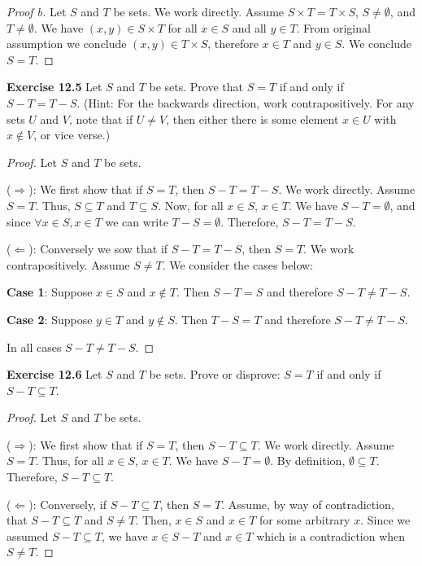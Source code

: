 \documentclass[12pt,oneside]{article}
\newenvironment{exercise}[1]{\vspace{.1in}\noindent\textbf{Exercise #1 \hspace{.05em}}}{}
\begin{document}
\begin{proof}[Proof b]
Let $S$ and $T$ be sets. We work directly. Assume $S \times T = T \times S$, $S \not= \emptyset$, and $T \not= \emptyset$. We have $(x, y) \in S \times T$ for all $x \in S$ and all $y \in T$. From original assumption we conclude $(x, y) \in T \times S$, therefore $x \in T$ and $y \in S$. We conclude $S = T$.
\end{proof}



\begin{exercise}{12.5}
Let $S$ and $T$ be sets. Prove that $S = T$ if and only if $S - T = T - S$. (Hint: For the backwards direction, work contrapositively. For any sets $U$ and $V$, note that if $U \not= V$, then either there is some element $x \in U$ with $x \notin V$, or vice verse.)
\end{exercise}

\begin{proof}
Let $S$ and $T$ be sets.

($\Rightarrow$): We first show that if $S = T$, then $S - T = T - S$. We work directly. Assume $S = T$. Thus, $S \subseteq T$ and $T \subseteq S$. Now, for all $x \in S$, $x \in T$. We have $S - T = \emptyset$, and since $\forall x \in S, x \in T$ we can write $T - S = \emptyset$. Therefore, $S - T = T - S$.

($\Leftarrow$): Conversely we sow that if $S - T = T - S$, then $S = T$. We work contrapositively. Assume $S \not= T$. We consider the cases below:

\textbf{Case 1}: Suppose $x \in S$ and $x \notin T$. Then $S - T = S$ and therefore $S - T \not= T - S$.

\textbf{Case 2}: Suppose $y \in T$ and $y \notin S$. Then $T - S = T$ and therefore $S - T \not= T - S$.

In all cases $S - T \not= T - S$.
\end{proof}



\begin{exercise}{12.6}
Let $S$ and $T$ be sets. Prove or disprove: $S = T$ if and only if $S - T \subseteq T$.
\end{exercise}

\begin{proof}
Let $S$ and $T$ be sets.

($\Rightarrow$): We first show that if $S = T$, then $S - T \subseteq T$. We work directly. Assume $S = T$. Thus, for all $x \in S$, $x \in T$. We have $S - T = \emptyset$. By definition, $\emptyset \subseteq T$. Therefore, $S - T \subseteq T$.

($\Leftarrow$): Conversely, if $S - T \subseteq T$, then $S = T$. Assume, by way of contradiction, that $S - T \subseteq T$ and $S \not= T$. Then, $x \in S$ and $x \in T$ for some arbitrary $x$. Since we assumed $S - T \subseteq T$, we have $x \in S - T$ and $x \in T$ which is a contradiction when $S \not= T$.
\end{proof}
\end{document}
